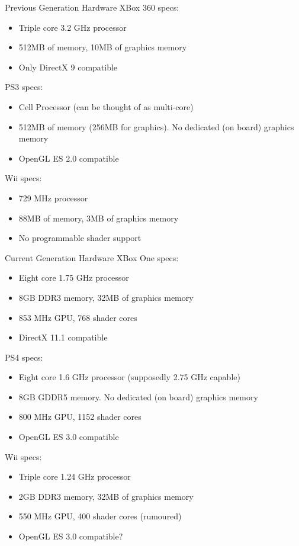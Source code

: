 \documentclass[handout,18pt]{beamer}
\begin{document}
\begin{frame}{Previous Generation Hardware}
\pause
XBox 360 specs:
\begin{itemize}
\item Triple core 3.2 GHz processor
\item 512MB of memory, 10MB of graphics memory
\item Only DirectX 9 compatible
\end{itemize}
\pause

\vspace{11pt}
PS3 specs:
\begin{itemize}
\item Cell Processor (can be thought of as multi-core)
\item 512MB of memory (256MB for graphics).  No dedicated (on board)
graphics memory
\item OpenGL ES 2.0 compatible
\end{itemize}
\pause{}

\vspace{11pt}
Wii specs:
\begin{itemize}
\item 729 MHz processor
\item 88MB of memory, 3MB of graphics memory
\item No programmable shader support
\end{itemize}
\end{frame}

\begin{frame}{Current Generation Hardware}
\pause
XBox One specs:
\begin{itemize}
\item Eight core 1.75 GHz processor
\item 8GB DDR3 memory, 32MB of graphics memory
\item 853 MHz GPU, 768 shader cores
\item DirectX 11.1 compatible
\end{itemize}
\pause

\vspace{5pt}
PS4 specs:
\begin{itemize}
\item Eight core 1.6 GHz processor (supposedly 2.75 GHz capable)
\item 8GB GDDR5 memory.  No dedicated (on board)
graphics memory
\item 800 MHz GPU, 1152 shader cores
\item OpenGL ES 3.0 compatible
\end{itemize}
\pause{}

\vspace{5pt}
Wii specs:
\begin{itemize}
\item Triple core 1.24 GHz processor
\item 2GB DDR3 memory, 32MB of graphics memory
\item 550 MHz GPU, 400 shader cores (rumoured)
\item OpenGL ES 3.0 compatible?
\end{itemize}
\end{frame}
\end{document}

